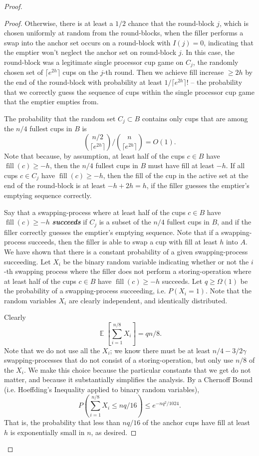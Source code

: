 \documentclass[twocolumn]{article}[10pt]
\newcommand{\defn}[1]{{\textit{\textbf{\boldmath #1}}}\xspace}
\DeclareMathOperator{\E}{\mathbb{E}}
\DeclareMathOperator{\fil}{\text{fill}}
\begin{document}
\begin{proof}
\begin{proof}
  Otherwise, there is at least a $1/2$ chance that the round-block $j$, which
  is chosen uniformly at random from the round-blocks, when the filler performs
  a swap into the anchor set occurs on a round-block with $I(j)=0$, indicating
  that the emptier won't neglect the anchor set on round-block $j$. In this
  case, the round-block was a legitimate single processor cup game on $C_j$,
  the randomly chosen set of $\lceil e^{2h} \rceil$ cups on the $j$-th round.
  Then we achieve fill increase $\ge 2h$ by the end of the round-block with
  probability at least $1/\lceil e^{2h}\rceil!$ -- the probability that we
  correctly guess the sequence of cups within the single processor cup game
  that the emptier empties from. 

  The probability that the random set $C_j \subset B$ contains only cups that
  are among the $n/4$ fullest cups in $B$ is $${n/2 \choose {\lceil e^{2h}
  \rceil}} / {n \choose {\lceil e^{2h}\rceil}} = O(1).$$ Note that because, by
  assumption, at least half of the cups $c \in B$ have $\fil(c) \ge -h$, then
  the $n/4$ fullest cups in $B$ must have fill at least $-h$. If all cups $
  c\in C_j$ have $\fil(c) \ge -h$, then the fill of the cup in the active set
  at the end of the round-block is at least $-h + 2h = h$, if the filler
  guesses the emptier's emptying sequence correctly.

  Say that a swapping-process where at least half of the cups $c\in B$ have
  $\fil(c) \ge -h$ \defn{succeeds} if $C_j$ is a subset of the $n/4$ fullest
  cups in $B$, and if the filler correctly guesses the emptier's emptying
  sequence. Note that if a swapping-process succeeds, then the filler is able
  to swap a cup with fill at least $h$ into $A$. We have shown that there is a
  constant probability of a given swapping-process succeeding. Let $X_i$ be the
  binary random variable indicating whether or not the $i$-th swapping process
  where the filler does not perform a storing-operation where at least half of
  the cups $c\in B$ have $\fil(c) \ge -h$ succeeds. Let $q \ge \Omega(1)$ be
  the probability of a swapping-process succeeding, i.e. $P(X_i=1)$. Note that
  the random variables $X_i$ are clearly independent, and identically
  distributed.

  Clearly $$\E\left[\sum_{i=1}^{n/8} X_i\right] = qn/8.$$ Note that we do not
  use all the $X_i$; we know there must be at least $n/4 - 3/2 \gamma$
  swapping-processes that do not consist of a storing-operation, but only use
  $n/8$ of the $X_i$. We make this choice because the particular constants that
  we get do not matter, and because it substantially simplifies the analysis.
  By a Chernoff Bound (i.e. Hoeffding's Inequality applied to binary random variables),
  $$P\left(\sum_{i=1}^{n/8} X_i\le nq/16\right) \le e^{-nq^2/1024}.$$ That is, the
  probability that less than $nq/16$ of the anchor cups have fill at least $h$ is
  exponentially small in $n$, as desired.

\end{proof}
  
\end{proof}
\end{document}
